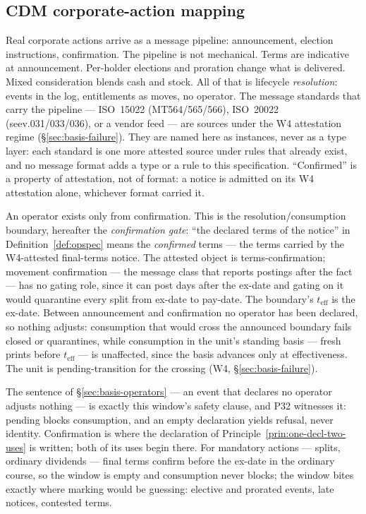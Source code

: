\subsection{CDM corporate-action mapping}
\label{sec:basis-cdm}

Real corporate actions arrive as a message pipeline: announcement, election
instructions, confirmation. The pipeline is not mechanical. Terms are
indicative at announcement. Per-holder elections and proration change what is
delivered. Mixed consideration blends cash and stock. All of that is lifecycle
\emph{resolution}: events in the log, entitlements as moves, no operator. The
message standards that carry the pipeline --- ISO~15022 (MT564/565/566),
ISO~20022 (seev.031/033/036), or a vendor feed --- are sources under the W4
attestation regime (\S\ref{sec:basis-failure}). They are named here as
instances, never as a type layer: each standard is one more attested source
under rules that already exist, and no message format adds a type or a rule
to this specification. ``Confirmed'' is a property of attestation, not of
format: a notice is admitted on its W4 attestation alone, whichever format
carried it.

An operator exists only from confirmation. This is the resolution/consumption
boundary, hereafter the \emph{confirmation gate}: ``the declared terms of the
notice'' in Definition~\ref{def:opspec} means the \emph{confirmed} terms ---
the terms carried by the W4-attested final-terms notice. The attested object
is terms-confirmation; movement confirmation --- the message class that
reports postings after the fact --- has no gating role, since it can post days
after the ex-date and gating on it would quarantine every split from ex-date
to pay-date. The boundary's $t_{\mathrm{eff}}$ is the ex-date. Between
announcement and confirmation no operator has been declared, so nothing
adjusts: consumption that would cross the announced boundary fails closed or
quarantines, while consumption in the unit's standing basis --- fresh prints
before $t_{\mathrm{eff}}$ --- is unaffected, since the basis advances only at
effectiveness. The unit is pending-transition for the crossing (W4,
\S\ref{sec:basis-failure}).

The sentence of
\S\ref{sec:basis-operators} --- an event that declares no operator adjusts
nothing --- is exactly this window's safety clause, and P32 witnesses it:
pending blocks consumption, and an empty declaration yields refusal, never
identity.
Confirmation is where the declaration of
Principle~\ref{prin:one-decl-two-uses} is written; both of its uses begin
there. For mandatory actions --- splits, ordinary dividends --- final terms
confirm before the ex-date in the ordinary course, so the window is empty and
consumption never blocks; the window bites exactly where marking would be
guessing: elective and prorated events, late notices, contested terms.

